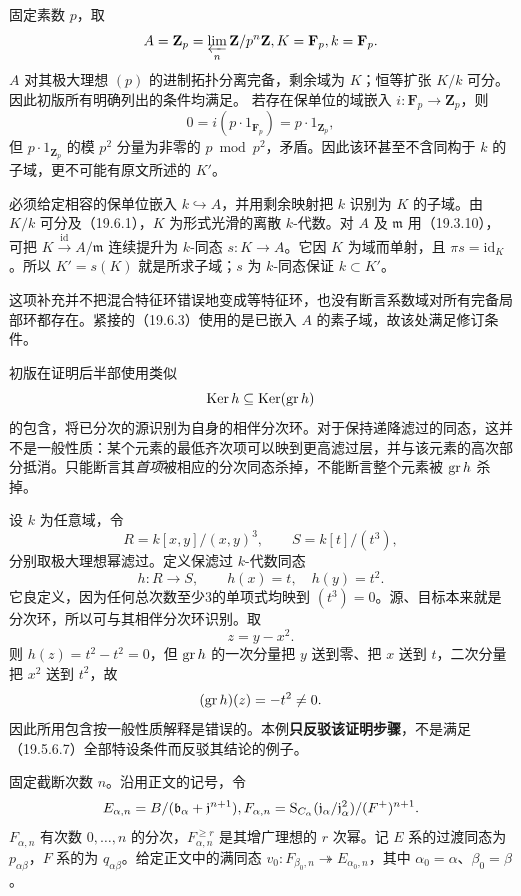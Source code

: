 固定素数 $p$，取
\[
 A=\mathbf Z_p=\varprojlim_n\mathbf Z/p^n\mathbf Z,
 \qquad K=\mathbf F_p,\qquad k=\mathbf F_p.
\]
$A$ 对其极大理想 $(p)$ 的进制拓扑分离完备，剩余域为 $K$；恒等扩张 $K/k$ 可分。因此初版所有明确列出的条件均满足。
若存在保单位的域嵌入 $i:\mathbf F_p\to\mathbf Z_p$，则
\[
 0=i(p\cdot1_{\mathbf F_p})=p\cdot1_{\mathbf Z_p},
\]
但 $p\cdot1_{\mathbf Z_p}$ 的模 $p^2$ 分量为非零的 $p\bmod p^2$，矛盾。因此该环甚至不含同构于 $k$ 的子域，更不可能有原文所述的 $K'$。

必须给定相容的保单位嵌入 $k\hookrightarrow A$，并用剩余映射把 $k$ 识别为 $K$ 的子域。由 $K/k$ 可分及（19.6.1），$K$ 为形式光滑的离散 $k$-代数。对 $A$ 及 $\mathfrak m$ 用（19.3.10），可把 $K\xrightarrow{\mathrm{id}}A/\mathfrak m$ 连续提升为 $k$-同态 $s:K\to A$。它因 $K$ 为域而单射，且 $\pi s=\mathrm{id}_K$。所以 $K'=s(K)$ 就是所求子域；$s$ 为 $k$-同态保证 $k\subset K'$。

这项补充并不把混合特征环错误地变成等特征环，也没有断言系数域对所有完备局部环都存在。紧接的（19.6.3）使用的是已嵌入 $A$ 的素子域，故该处满足修订条件。

初版在证明后半部使用类似
\[
 \Ker h\subseteq\Ker(\gr h)
\]
的包含，将已分次的源识别为自身的相伴分次环。对于保持递降滤过的同态，这并不是一般性质：某个元素的最低齐次项可以映到更高滤过层，并与该元素的高次部分抵消。只能断言其\emph{首项}被相应的分次同态杀掉，不能断言整个元素被 $\gr h$ 杀掉。

设 $k$ 为任意域，令
\[
 R=k[x,y]/(x,y)^3,\qquad S=k[t]/(t^3),
\]
分别取极大理想幂滤过。定义保滤过 $k$-代数同态
\[
 h:R\to S,\qquad h(x)=t,\quad h(y)=t^2.
\]
它良定义，因为任何总次数至少3的单项式均映到 $(t^3)=0$。源、目标本来就是分次环，所以可与其相伴分次环识别。取
\[
 z=y-x^2.
\]
则 $h(z)=t^2-t^2=0$，但 $\gr h$ 的一次分量把 $y$ 送到零、把 $x$ 送到 $t$，二次分量把 $x^2$ 送到 $t^2$，故
\[
 (\gr h)(z)=-t^2\ne0.
\]
因此所用包含按一般性质解释是错误的。本例\textbf{只反驳该证明步骤}，不是满足（19.5.6.7）全部特设条件而反驳其结论的例子。

固定截断次数 $n$。沿用正文的记号，令
\[
 E_{\alpha,n}=B/(\mathfrak b_\alpha+\mathfrak j^{n+1}),\qquad
 F_{\alpha,n}=\Salg_{C_\alpha}
 (\mathfrak j_\alpha/\mathfrak j_\alpha^2)/(F^+)^{n+1}.
\]
$F_{\alpha,n}$ 有次数 $0,\ldots,n$ 的分次，$F_{\alpha,n}^{\geq r}$ 是其增广理想的 $r$ 次幂。记 $E$ 系的过渡同态为 $p_{\alpha\beta}$，$F$ 系的为 $q_{\alpha\beta}$。给定正文中的满同态
$v_0:F_{\beta_0,n}\twoheadrightarrow E_{\alpha_0,n}$，其中 $\alpha_0=\alpha$、$\beta_0=\beta$。

